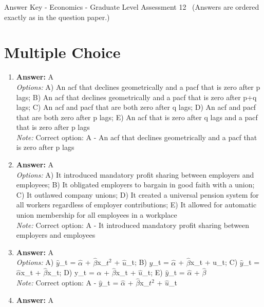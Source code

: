 \documentclass[12pt]{article}
\begin{document}
\begin{center}
Answer Key - Economics - Graduate Level Assessment 12 \
\small (Answers are ordered exactly as in the question paper.)
\end{center}

\section*{Multiple Choice}
\begin{enumerate}[label=\arabic*.]
\item \textbf{Answer:} A
\\ \textit{Options:} A) An acf that declines geometrically and a pacf that is zero after p lags; B) An acf that declines geometrically and a pacf that is zero after p+q lags; C) An acf and pacf that are both zero after q lags; D) An acf and pacf that are both zero after p lags; E) An acf that is zero after q lags and a pacf that is zero after p lags
\\ \textit{Note:} Correct option: A - An acf that declines geometrically and a pacf that is zero after p lags
\item \textbf{Answer:} A
\\ \textit{Options:} A) It introduced mandatory profit sharing between employers and employees; B) It obligated employers to bargain in good faith with a union; C) It outlawed company unions; D) It created a universal pension system for all workers regardless of employer contributions; E) It allowed for automatic union membership for all employees in a workplace
\\ \textit{Note:} Correct option: A - It introduced mandatory profit sharing between employers and employees
\item \textbf{Answer:} A
\\ \textit{Options:} A) \ensuremath{\hat{y}}\_t = \ensuremath{\hat{\alpha}} + \ensuremath{\hat{\beta}}x\_$t^2$ + \ensuremath{\hat{u}}\_t; B) \ensuremath{\hat{y}}\_t = \ensuremath{\hat{\alpha}} + \ensuremath{\hat{\beta}}x\_t + u\_t; C) \ensuremath{\hat{y}}\_t = \ensuremath{\hat{\alpha}}x\_t + \ensuremath{\hat{\beta}}x\_t; D) y\_t = \ensuremath{\hat{\alpha}} + \ensuremath{\hat{\beta}}x\_t + \ensuremath{\hat{u}}\_t; E) \ensuremath{\hat{y}}\_t = \ensuremath{\hat{\alpha}} + \ensuremath{\hat{\beta}}
\\ \textit{Note:} Correct option: A - \ensuremath{\hat{y}}\_t = \ensuremath{\hat{\alpha}} + \ensuremath{\hat{\beta}}x\_$t^2$ + \ensuremath{\hat{u}}\_t
\item \textbf{Answer:} A

\end{enumerate}
\end{document}
